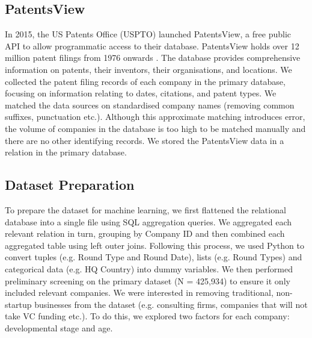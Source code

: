 \documentclass[../thesis/thesis.tex]{subfiles}
\begin{document}
\subsection{PatentsView}

In 2015, the US Patents Office (USPTO) launched PatentsView, a free public API to allow programmatic access to their database. PatentsView holds over 12 million patent filings from 1976 onwards \cite{schultz2016}. The database provides comprehensive information on patents, their inventors, their organisations, and locations. We collected the patent filing records of each company in the primary database, focusing on information relating to dates, citations, and patent types. We matched the data sources on standardised company names (removing common suffixes, punctuation etc.). Although this approximate matching introduces error, the volume of companies in the database is too high to be matched manually and there are no other identifying records. We stored the PatentsView data in a relation in the primary database.

\subsection{Dataset Preparation}

To prepare the dataset for machine learning, we first flattened the relational database into a single file using SQL aggregation queries. We aggregated each relevant relation in turn, grouping by Company ID and then combined each aggregated table using left outer joins. Following this process, we used Python to convert tuples (e.g. Round Type and Round Date), lists (e.g. Round Types) and categorical data (e.g. HQ Country) into dummy variables. We then performed preliminary screening on the primary dataset (N = 425,934) to ensure it only included relevant companies. We were interested in removing traditional, non-startup businesses from the dataset (e.g. consulting firms, companies that will not take VC funding etc.). To do this, we explored two factors for each company: developmental stage and age.
\end{document}
